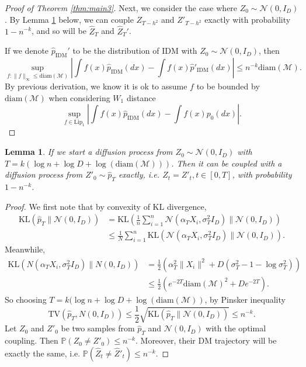 \documentclass{article}
\newtheorem{lemma}[theorem]{Lemma}
\def\Prob{{\mathbb P}}
\def\phat{\hat{p}}
\def\calM{\mathcal{M}}
\def\Zhat{\widehat{Z}}
\begin{document}
\begin{proof}[Proof of Theorem \ref{thm:main3}]
Next, we consider the case where $Z_0\sim \mathcal{N}(0,I_D)$. By Lemma \ref{lem:inipatch} below, we can 
couple $Z_{T-h^2}$ and $Z'_{T-h^2}$ exactly with probability $1-n^{-k}$, and so will be $\Zhat_{T}$ and $\Zhat_{T}'$.

If we denote $\phat_{\text{IDM}}'$ to be the distribution of IDM with $Z_0\sim \mathcal{N}(0,I_D)$, then 
\[
\sup_{f:\|f\|_\infty\leq \text{diam}(\calM)} |\int f(x)\phat_{\text{IDM}}(dx)-\int f(x)\phat'_{\text{IDM}}(dx)|\leq n^{-k}\text{diam}(\calM). 
\]
By previous derivation, we know it is ok to assume $f$ to be bounded by $\text{diam}(\calM)$ when considering $W_1$ distance
\[
\sup_{f\in \text{Lip}_1} |\int f(x)\phat_{\text{IDM}}(dx)-\int f(x)p_0(dx)|.
\]

\end{proof}
\begin{lemma}
\label{lem:inipatch}
If we start a diffusion process from $Z_0\sim \mathcal{N}(0,I_D)$ with $T=k(\log n+\log D+\log (\text{diam}(\calM)))$. Then it can be coupled with a diffusion process from $Z'_0\sim \phat_T$ exactly, i.e. $Z_t=Z'_t, t\in [0,T]$, with probability $1-n^{-k}$.  
\end{lemma}
\begin{proof}
    We first note that by convexity of KL divergence,
\begin{align*}
\text{KL}(\phat_T\|\mathcal{N}(0,I_D))&=
\text{KL}(\frac{1}{n}\sum_{i=1}^n \mathcal{N}(\alpha_T X_i, \sigma_T^2 I_D)\|\mathcal{N}(0,I_D))\\
&\leq \frac{1}{N}\sum_{i=1}^n\text{KL}(\mathcal{N}(\alpha_T X_i, \sigma_T^2 I_D)\|\mathcal{N}(0,I_D)). 
\end{align*}
Meanwhile, 
\begin{align*}
\text{KL}(N(\alpha_T X_i, \sigma_T^2 I_D)\|N(0,I_D))
&=\frac12(\alpha^2_T\|X_i\|^2+D(\sigma_T^2-1-\log \sigma_T^2))\\
&\leq \frac12(e^{-2T}\text{diam}(\calM)^2+D e^{-2T}).
\end{align*}
So choosing $T=k(\log n +\log D+\log (\text{diam}(\calM))$, by Pinsker inequality
\[
\text{TV}(\phat_T,N(0,I_D))\leq \frac12\sqrt{\text{KL}(\phat_T\|\mathcal{N}(0,I_D))}\leq n^{-k}.
\]
Let $Z_0$ and $Z'_0$ be two samples from $\phat_T$ and $\mathcal{N}(0,I_D)$ with the optimal coupling. Then $\Prob(Z_0\neq Z'_0)\leq n^{-k}$. Moreover, their DM trajectory will be exactly the same, i.e. $\Prob(\widehat{Z}_t\neq \widehat{Z}'_t)\leq n^{-k}$. 
\end{proof}
\end{document}

